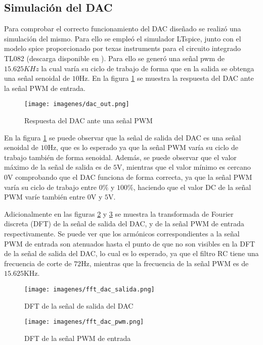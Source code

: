     \subsection{Simulación del DAC}

    Para comprobar el correcto funcionamiento del DAC diseñado se realizó una
    simulación del mismo. Para ello se empleó el simulador LTspice, junto con
    el modelo spice proporcionado por texas instruments para el circuito integrado
    TL082 (descarga disponible en \cite{noauthor_tl082_nodate}). Para ello se 
    generó una señal pwm de $15.625KHz$ la cual varía su ciclo de trabajo 
    de forma que en la salida se obtenga una señal senoidal de $10\text{Hz}$. 
    En la figura
    \ref{fig:sim_dac} se muestra la respuesta del DAC ante la señal PWM de entrada.

    \begin{figure}[H]
        \centering
        \texttt{[image: imagenes/dac\_out.png]}
        \caption{Respuesta del DAC ante una señal PWM}
        \label{fig:sim_dac}
    \end{figure}

    En la figura \ref{fig:sim_dac} se puede observar que la señal de salida
    del DAC es una señal senoidal de $10\text{Hz}$, que es lo esperado ya 
    que la señal PWM varía su ciclo de trabajo también de forma senoidal.
    Además, se puede observar que el valor máximo de la señal de salida es
    de $5\text{V}$, mientras que el valor mínimo es cercano $0\text{V}$
    comprobando que el DAC funciona de forma correcta, ya que la señal PWM
    varía su ciclo de trabajo entre $0\%$ y $100\%$, haciendo que el valor 
    DC de la señal PWM varíe también entre $0\text{V}$ y $5\text{V}$.

    Adicionalmente en las figuras \ref{fig:sim_dac_fft} y \ref{fig:sim_dac_fft_in}
    se muestra la transformada de Fourier discreta (DFT) de la señal de salida
    del DAC, y de la señal PWM de entrada respectivamente. Se puede ver 
    que los armónicos correspondientes a la señal PWM de entrada son atenuados
    hasta el punto de que no son visibles en la DFT de la señal de salida del
    DAC, lo cual es lo esperado, ya que el filtro RC tiene una frecuencia de corte
    de $72\text{Hz}$, mientras que la frecuencia de la señal PWM es de 
    $15.625\text{KHz}$.

    \begin{figure}[H]
        \centering
        \texttt{[image: imagenes/fft\_dac\_salida.png]}
        \caption{DFT de la señal de salida del DAC}
        \label{fig:sim_dac_fft}
    \end{figure}

    \begin{figure}[H]
        \centering
        \texttt{[image: imagenes/fft\_dac\_pwm.png]}
        \caption{DFT de la señal PWM de entrada}
        \label{fig:sim_dac_fft_in}
    \end{figure}

